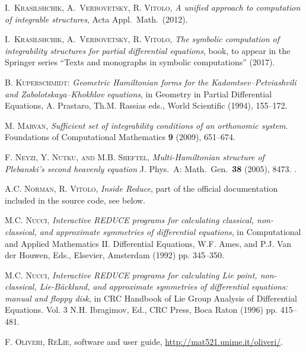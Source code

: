\begin{thebibliography}{999}
 \textsc{I.~Krasil{\cprime}shchik, A.~Verbovetsky,
    R. Vitolo},  \emph{A unified approach to computation of integrable
    structures}, Acta Appl.\ Math.\ (2012).

 \textsc{I.~Krasil{\cprime}shchik, A.~Verbovetsky,
    R. Vitolo},  \emph{The symbolic computation of integrability structures for
    partial differential equations}, book, to appear in the Springer series
``Texts and monographs in symbolic computations'' (2017).

 \textsc{B. Kuperschmidt}:
  \emph{Geometric Hamiltonian forms for the
    Kadomtsev--Petviashvili and Zabolotskaya--Khokhlov equations}, in Geometry
  in Partial Differential Equations, A. Prastaro, Th.M. Rassias eds., World
  Scientific (1994), 155--172.

 \textsc{M. Marvan}, \emph{Sufficient set of integrability
    conditions of an orthonomic system}.  Foundations of Computational
    Mathematics \textbf{9} (2009), 651--674.

 \textsc{F. Neyzi, Y. Nutku, and
      M.B. Sheftel}, \emph{Multi-Hamiltonian structure of Plebanski's second
      heavenly equation} J. Phys.\ A: Math.\ Gen.\ \textbf{38} (2005),
    8473. .

 \textsc{A.C. Norman, R. Vitolo}, \emph{Inside Reduce}, part
    of the official \REDUCE documentation included in the source code, see
    below.

 \textsc{M.C. Nucci}, \emph{Interactive REDUCE
      programs for calculating classical, non-classical, and approximate
      symmetries of differential equations}, in Computational and Applied
    Mathematics II. Differential Equations, W.F. Ames, and P.J. Van der Houwen,
    Eds., Elsevier, Amsterdam (1992) pp. 345--350.

 \textsc{M.C. Nucci}, \emph{Interactive REDUCE programs for
    calculating Lie point, non-classical, Lie-B\"{a}cklund, and approximate
    symmetries of differential equations: manual and floppy disk}, in
CRC Handbook of Lie Group Analysis of Differential Equations. Vol. 3
N.H. Ibragimov, Ed., CRC Press, Boca Raton (1996) pp. 415--481.

 \textsc{F. Oliveri}, \textsc{ReLie}, \REDUCE software and user
  guide, \url{http://mat521.unime.it/oliveri/}.


\end{thebibliography}
